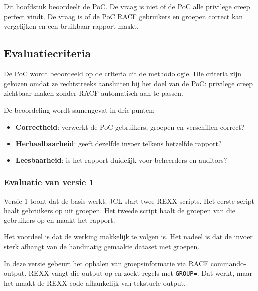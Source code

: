 \chapter[Evaluatie]{}%
\label{ch:evaluatie}

Dit hoofdstuk beoordeelt de PoC. De vraag is niet of de PoC alle privilege creep perfect vindt. De vraag is of de PoC RACF gebruikers en groepen correct kan vergelijken en een bruikbaar rapport maakt.

\section{Evaluatiecriteria}

De PoC wordt beoordeeld op de criteria uit de methodologie. Die criteria zijn gekozen omdat ze rechtstreeks aansluiten bij het doel van de PoC: privilege creep zichtbaar maken zonder RACF automatisch aan te passen.

De beoordeling wordt samengevat in drie punten:

\begin{itemize}
	\item \textbf{Correctheid}: verwerkt de PoC gebruikers, groepen en verschillen correct?
	\item \textbf{Herhaalbaarheid}: geeft dezelfde invoer telkens hetzelfde rapport?
	\item \textbf{Leesbaarheid}: is het rapport duidelijk voor beheerders en auditors?
\end{itemize}

\subsection*{Evaluatie van versie 1}

Versie 1 toont dat de basis werkt. JCL start twee REXX scripts. Het eerste script haalt gebruikers op uit groepen. Het tweede script haalt de groepen van die gebruikers op en maakt het rapport.

Het voordeel is dat de werking makkelijk te volgen is. Het nadeel is dat de invoer sterk afhangt van de handmatig gemaakte dataset met groepen.

In deze versie gebeurt het ophalen van groepsinformatie via RACF commando-output. REXX vangt die output op en zoekt regels met \texttt{GROUP=}. Dat werkt, maar het maakt de REXX code afhankelijk van tekstuele output.

